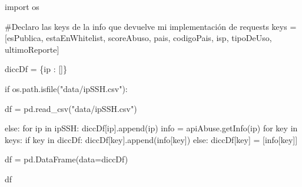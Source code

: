 \documentclass[
  letterpaper,
  DIV=11,
  numbers=noendperiod]{scrartcl}
\newenvironment{Shaded}{\begin{snugshade}}{\end{snugshade}}
\newcommand{\CommentTok}[1]{\textcolor[rgb]{0.37,0.37,0.37}{#1}}
\newcommand{\ControlFlowTok}[1]{\textcolor[rgb]{0.00,0.23,0.31}{#1}}
\newcommand{\ImportTok}[1]{\textcolor[rgb]{0.00,0.46,0.62}{#1}}
\newcommand{\KeywordTok}[1]{\textcolor[rgb]{0.00,0.23,0.31}{#1}}
\newcommand{\NormalTok}[1]{\textcolor[rgb]{0.00,0.23,0.31}{#1}}
\newcommand{\OperatorTok}[1]{\textcolor[rgb]{0.37,0.37,0.37}{#1}}
\newcommand{\StringTok}[1]{\textcolor[rgb]{0.13,0.47,0.30}{#1}}
\begin{document}
\begin{Shaded}
\begin{Highlighting}[]
\ImportTok{import}\NormalTok{ os}
\end{Highlighting}
\end{Shaded}

\begin{Shaded}
\begin{Highlighting}[]
\CommentTok{\#Declaro las keys de la info que devuelve mi implementación de requests}
\NormalTok{keys }\OperatorTok{=}\NormalTok{ [}\StringTok{\textquotesingle{}esPublica\textquotesingle{}}\NormalTok{, }\StringTok{\textquotesingle{}estaEnWhitelist\textquotesingle{}}\NormalTok{, }\StringTok{\textquotesingle{}scoreAbuso\textquotesingle{}}\NormalTok{, }\StringTok{\textquotesingle{}pais\textquotesingle{}}\NormalTok{, }\StringTok{\textquotesingle{}codigoPais\textquotesingle{}}\NormalTok{, }\StringTok{\textquotesingle{}isp\textquotesingle{}}\NormalTok{, }\StringTok{\textquotesingle{}tipoDeUso\textquotesingle{}}\NormalTok{, }\StringTok{\textquotesingle{}ultimoReporte\textquotesingle{}}\NormalTok{]}

\NormalTok{diccDf }\OperatorTok{=}\NormalTok{ \{}\StringTok{\textquotesingle{}ip\textquotesingle{}}\NormalTok{ : []\}}

\ControlFlowTok{if}\NormalTok{ os.path.isfile(}\StringTok{"data/ipSSH.csv"}\NormalTok{):}
    
\NormalTok{    df }\OperatorTok{=}\NormalTok{ pd.read\_csv(}\StringTok{"data/ipSSH.csv"}\NormalTok{)}
    
\ControlFlowTok{else}\NormalTok{:}
    \ControlFlowTok{for}\NormalTok{ ip }\KeywordTok{in}\NormalTok{ ipSSH:}
\NormalTok{        diccDf[}\StringTok{\textquotesingle{}ip\textquotesingle{}}\NormalTok{].append(ip)}
\NormalTok{        info }\OperatorTok{=}\NormalTok{ apiAbuse.getInfo(ip)}
        \ControlFlowTok{for}\NormalTok{ key }\KeywordTok{in}\NormalTok{ keys:}
            \ControlFlowTok{if}\NormalTok{ key }\KeywordTok{in}\NormalTok{ diccDf:}
\NormalTok{                diccDf[key].append(info[key])}
            \ControlFlowTok{else}\NormalTok{:}
\NormalTok{                diccDf[key] }\OperatorTok{=}\NormalTok{ [info[key]]}

\NormalTok{        df }\OperatorTok{=}\NormalTok{ pd.DataFrame(data}\OperatorTok{=}\NormalTok{diccDf)}
\end{Highlighting}
\end{Shaded}

\begin{Shaded}
\begin{Highlighting}[]
\NormalTok{df}
\end{Highlighting}
\end{Shaded}
\end{document}
